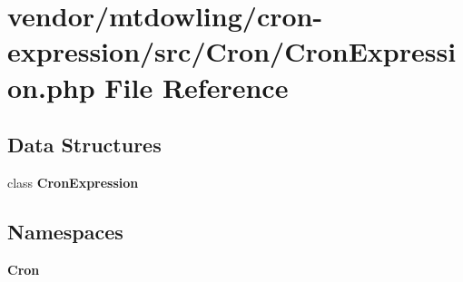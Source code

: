 \section{vendor/mtdowling/cron-\/expression/src/\+Cron/\+Cron\+Expression.php File Reference}
\label{_cron_expression_8php}
\subsection*{Data Structures}
\begin{DoxyCompactItemize}
\item 
class {\bf Cron\+Expression}
\end{DoxyCompactItemize}
\subsection*{Namespaces}
\begin{DoxyCompactItemize}
\item 
 {\bf Cron}
\end{DoxyCompactItemize}
